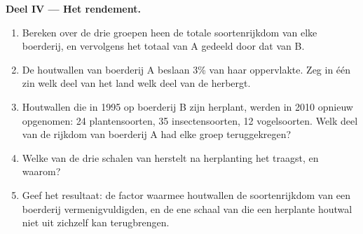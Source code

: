 \begin{problem}
\medskip
\noindent\textbf{Deel IV --- Het rendement.}
\begin{enumerate}[resume]
  \item Bereken over de drie groepen heen de totale soortenrijkdom van
        elke boerderij, en vervolgens het totaal van A gedeeld door dat
        van B.
  \item De houtwallen van boerderij A beslaan 3\% van haar oppervlakte.
        Zeg in één zin welk deel van het land welk deel van de 
        herbergt.
  \item Houtwallen die in 1995 op boerderij B zijn herplant, werden in
        2010 opnieuw opgenomen: 24 plantensoorten, 35 insectensoorten,
        12 vogelsoorten. Welk deel van de rijkdom van boerderij A had
        elke groep teruggekregen?
  \item Welke van de drie schalen van  herstelt na
        herplanting het traagst, en waarom?
  \item Geef het resultaat: de factor waarmee houtwallen de soortenrijkdom
        van een boerderij vermenigvuldigden, en de ene schaal van
         die een herplante houtwal niet uit zichzelf kan
        terugbrengen.
\end{enumerate}
\end{problem}
